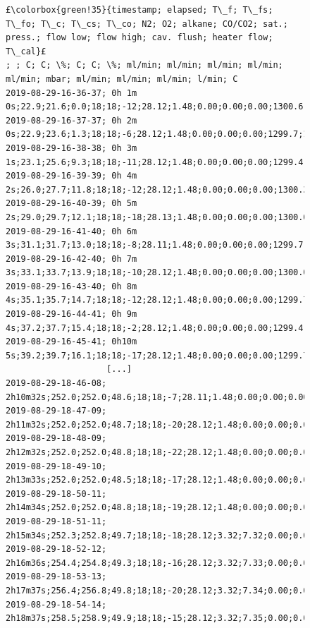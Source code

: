 \documentclass[12pt]{article}
\begin{document}
\clearpage
\begin{landscape}
\begin{figure}[tbh]
\begin{lstlisting}[escapechar=£,
    linewidth=24cm]
£\colorbox{green!35}{timestamp; elapsed; T\_f; T\_fs; T\_fo; T\_c; T\_cs; T\_co; N2; O2; alkane; CO/CO2; sat.; press.; flow low; flow high; cav. flush; heater flow; T\_cal}£
; ; C; C; \%; C; C; \%; ml/min; ml/min; ml/min; ml/min; ml/min; mbar; ml/min; ml/min; ml/min; l/min; C
2019-08-29-16-36-37; 0h 1m 0s;22.9;21.6;0.0;18;18;-12;28.12;1.48;0.00;0.00;0.00;1300.6;1.210;0.00;15;8;20.6
2019-08-29-16-37-37; 0h 2m 0s;22.9;23.6;1.3;18;18;-6;28.12;1.48;0.00;0.00;0.00;1299.7;1.210;0.00;15;8;21.0
2019-08-29-16-38-38; 0h 3m 1s;23.1;25.6;9.3;18;18;-11;28.12;1.48;0.00;0.00;0.00;1299.4;1.209;0.00;15;8;20.5
2019-08-29-16-39-39; 0h 4m 2s;26.0;27.7;11.8;18;18;-12;28.12;1.48;0.00;0.00;0.00;1300.3;1.211;0.00;15;8;21.0
2019-08-29-16-40-39; 0h 5m 2s;29.0;29.7;12.1;18;18;-18;28.13;1.48;0.00;0.00;0.00;1300.0;1.210;0.00;15;8;20.3
2019-08-29-16-41-40; 0h 6m 3s;31.1;31.7;13.0;18;18;-8;28.11;1.48;0.00;0.00;0.00;1299.7;1.210;0.00;15;8;20.1
2019-08-29-16-42-40; 0h 7m 3s;33.1;33.7;13.9;18;18;-10;28.12;1.48;0.00;0.00;0.00;1300.0;1.211;0.00;15;8;20.3
2019-08-29-16-43-40; 0h 8m 4s;35.1;35.7;14.7;18;18;-12;28.12;1.48;0.00;0.00;0.00;1299.7;1.210;0.00;15;8;20.3
2019-08-29-16-44-41; 0h 9m 4s;37.2;37.7;15.4;18;18;-2;28.12;1.48;0.00;0.00;0.00;1299.4;1.212;0.00;15;8;20.9
2019-08-29-16-45-41; 0h10m 5s;39.2;39.7;16.1;18;18;-17;28.12;1.48;0.00;0.00;0.00;1299.7;1.210;0.00;15;8;21.9
                    [...]
2019-08-29-18-46-08; 2h10m32s;252.0;252.0;48.6;18;18;-7;28.11;1.48;0.00;0.00;0.00;1300.0;1.211;0.00;15;8;20.2
2019-08-29-18-47-09; 2h11m32s;252.0;252.0;48.7;18;18;-20;28.12;1.48;0.00;0.00;0.00;1300.6;1.211;0.00;15;8;20.2
2019-08-29-18-48-09; 2h12m32s;252.0;252.0;48.8;18;18;-22;28.12;1.48;0.00;0.00;0.00;1300.6;1.211;0.00;15;8;20.2
2019-08-29-18-49-10; 2h13m33s;252.0;252.0;48.5;18;18;-17;28.12;1.48;0.00;0.00;0.00;1300.0;1.212;0.00;15;8;20.7
2019-08-29-18-50-11; 2h14m34s;252.0;252.0;48.8;18;18;-19;28.12;1.48;0.00;0.00;0.00;1300.0;1.211;0.00;15;8;20.6
2019-08-29-18-51-11; 2h15m34s;252.3;252.8;49.7;18;18;-18;28.12;3.32;7.32;0.00;0.00;1300.0;0.653;0.95;15;8;20.6
2019-08-29-18-52-12; 2h16m36s;254.4;254.8;49.3;18;18;-16;28.12;3.32;7.33;0.00;0.00;1300.6;0.656;0.98;15;8;20.8
2019-08-29-18-53-13; 2h17m37s;256.4;256.8;49.8;18;18;-20;28.12;3.32;7.34;0.00;0.00;1300.6;0.656;1.00;15;8;20.1
2019-08-29-18-54-14; 2h18m37s;258.5;258.9;49.9;18;18;-15;28.12;3.32;7.35;0.00;0.00;1300.0;0.656;0.99;15;8;19.9

\end{lstlisting}
\end{figure}
\end{landscape}
\end{document}
